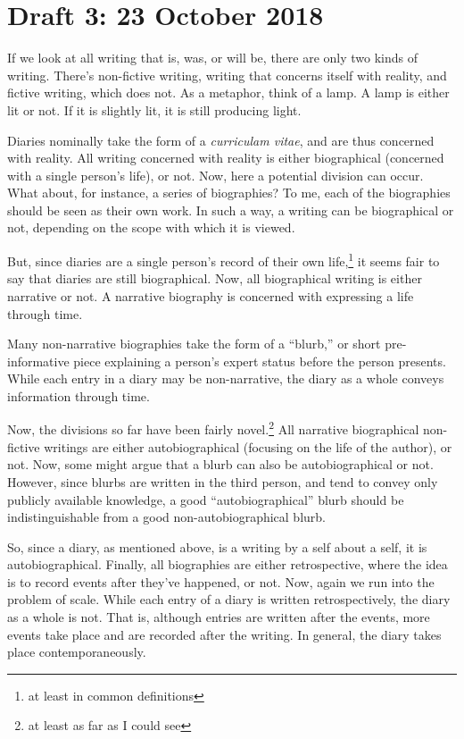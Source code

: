 \documentclass[12pt]{article}[titlepage]
\newcommand{\say}[1]{``#1''}
\newcommand{\1}{\={a}}
\newcommand{\2}{\={e}}
\newcommand{\3}{\={\i}}
\newcommand{\4}{\=o}
\newcommand{\5}{\=u}
\newcommand{\6}{\={A}}
\renewcommand{\,}{\textsuperscript{,}}
\begin{document}
\section{Draft 3: 23 October 2018}
If we look at all writing that is, was, or will be, there are only two kinds of writing.
There's non-fictive writing, writing that concerns itself with reality, and fictive writing, which does not.
As a metaphor, think of a lamp.
A lamp is either lit or not.
If it is slightly lit, it is still producing light.

Diaries nominally take the form of a \textit{curriculam vitae}, and are thus concerned with reality.
All writing concerned with reality is either biographical (concerned with a single person's life), or not.
Now, here a potential division can occur.
What about, for instance, a series of biographies?
To me, each of the biographies should be seen as their own work.
In such a way, a writing can be biographical or not, depending on the scope with which it is viewed.

But, since diaries are a single person's record of their own life,\footnote{at least in common definitions} it seems fair to say that diaries are still biographical.
Now, all biographical writing is either narrative or not.
A narrative biography is concerned with expressing a life through time.

Many non-narrative biographies take the form of a \say{blurb,} or short pre-informative piece explaining a person's expert status before the person presents.
While each entry in a diary may be non-narrative, the diary as a whole conveys information through time.

Now, the divisions so far have been fairly novel.\footnote{at least as far as I could see}
All narrative biographical non-fictive writings are either autobiographical (focusing on the life of the author), or not.
Now, some might argue that a blurb can also be autobiographical or not.
However, since blurbs are written in the third person, and tend to convey only publicly available knowledge, a good \say{autobiographical} blurb should be indistinguishable from a good non-autobiographical blurb.

So, since a diary, as mentioned above, is a writing by a self about a self, it is autobiographical.
Finally, all biographies are either retrospective, where the idea is to record events after they've happened, or not.
Now, again we run into the problem of scale.
While each entry of a diary is written retrospectively, the diary as a whole is not.
That is, although entries are written after the events, more events take place and are recorded after the writing.
In general, the diary takes place contemporaneously.
\end{document}
